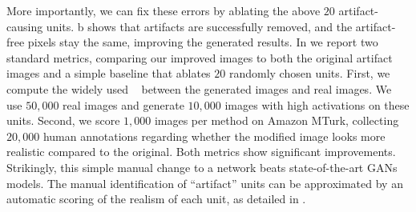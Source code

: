 \documentclass{article} %
\begin{document}
More importantly, we can fix these errors by ablating the above $20$ artifact-causing units. b shows that artifacts are successfully removed, and the artifact-free pixels stay the same, improving the generated results. In  we report two standard metrics, comparing our improved images to both the original artifact images and a simple baseline that ablates $20$ randomly chosen units. First, we compute the widely used \fid~\citep{heusel2017gans} between the generated images and real images. We use $50,000$ real images and generate $10,000$ images with high activations on these units. Second, we score $1,000$ images per method on Amazon MTurk, collecting $20,000$ human annotations regarding whether  the modified image looks more realistic compared to the original.  Both metrics show significant improvements.   Strikingly, this simple manual change to a network beats state-of-the-art GANs models.  The manual identification of ``artifact'' units can be approximated by an automatic scoring of the realism of each unit, as detailed in .
\end{document}
